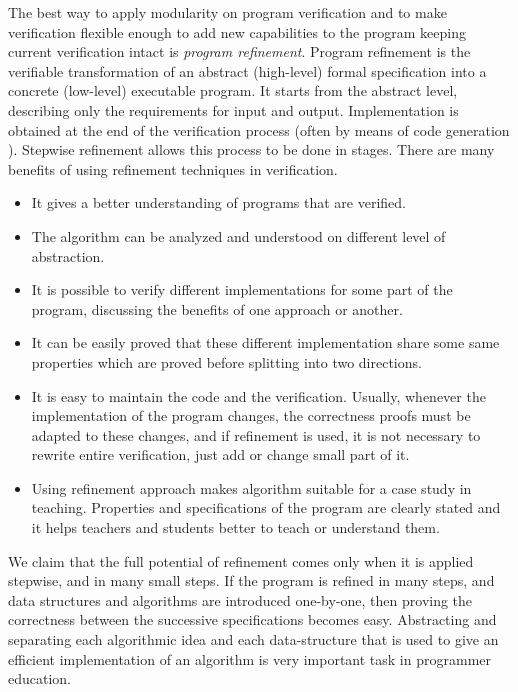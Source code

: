 \documentclass[11pt,a4paper]{article}
\begin{document}
The best way to apply modularity on program verification and to make
verification flexible enough to add new capabilities to the program
keeping current verification intact is \emph{program
  refinement}. Program refinement is the verifiable transformation of
an abstract (high-level) formal specification into a concrete
(low-level) executable program. It starts from the abstract level,
describing only the requirements for input and output. Implementation
is obtained at the end of the verification process (often by means of
code generation \cite{codegeneration}). Stepwise refinement allows this process to
be done in stages. There are many benefits of using refinement
techniques in verification.

\begin{itemize}
\item It gives a better understanding of programs that are verified.
\item The algorithm can be analyzed and understood on different level
  of abstraction.
\item It is possible to verify different implementations for some part
  of the program, discussing the benefits of one approach or another.
\item It can be easily proved that these different implementation
  share some same properties which are proved before splitting into
  two directions.
\item It is easy to maintain the code and the verification. Usually,
  whenever the implementation of the program changes, the correctness
  proofs must be adapted to these changes, and if refinement is used,
  it is not necessary to rewrite entire verification, just add or
  change small part of it.
\item Using refinement approach makes algorithm suitable for a case
  study in teaching. Properties and specifications of the program are
  clearly stated and it helps teachers and students better to teach or
  understand them.
\end{itemize}

We claim that the full potential of refinement comes only when it is
applied stepwise, and in many small steps. If the program is refined
in many steps, and data structures and algorithms are introduced
one-by-one, then proving the correctness between the successive
specifications becomes easy. Abstracting and separating each
algorithmic idea and each data-structure that is used to give an
efficient implementation of an algorithm is very important task in
programmer education.
\end{document}
